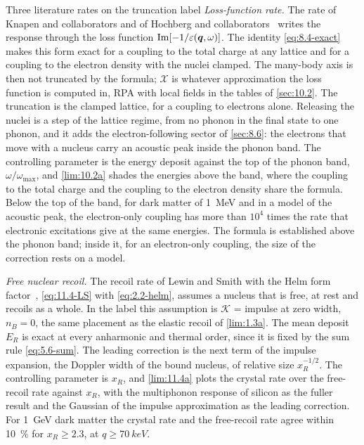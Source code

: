 \begin{workedexample}{Three literature rates on the truncation label}
\emph{Loss-function rate.} The rate of Knapen and collaborators and of Hochberg and collaborators~\cites[Eqs.~(6) and (13)]{knapen2021dark}[Eq.~(1)]{hochberg2021determining} writes the response through the loss function $\operatorname{Im}[-1/\varepsilon(\bm{q},\omega)]$. The identity \cref{eq:8.4-exact} makes this form exact for a coupling to the total charge at any lattice and for a coupling to the electron density with the nuclei clamped. The many-body axis is then not truncated by the formula; $\mathcal{X}$ is whatever approximation the loss function is computed in, RPA with local fields in the tables of \cref{sec:10.2}. The truncation is the clamped lattice, for a coupling to electrons alone. Releasing the nuclei is a step of the lattice regime, from no phonon in the final state to one phonon, and it adds the electron-following sector of \cref{sec:8.6}: the electrons that move with a nucleus carry an acoustic peak inside the phonon band. The controlling parameter is the energy deposit against the top of the phonon band, $\omega/\omega_{\max}$, and \cref{lim:10.2a} shades the energies above the band, where the coupling to the total charge and the coupling to the electron density share the formula. Below the top of the band, for dark matter of \SI{1}{MeV} and in a model of the acoustic peak, the electron-only coupling has more than $10^4$ times the rate that electronic excitations give at the same energies. The formula is established above the phonon band; inside it, for an electron-only coupling, the size of the correction rests on a model.

\emph{Free nuclear recoil.} The recoil rate of Lewin and Smith with the Helm form factor~\cite{lewin1996review}, \cref{eq:11.4-LS} with \cref{eq:2.2-helm}, assumes a nucleus that is free, at rest and recoils as a whole. In the label this assumption is $\mathcal{K}$ = impulse at zero width, $n_B = 0$, the same placement as the elastic recoil of \cref{lim:1.3a}. The mean deposit $E_R$ is exact at every anharmonic and thermal order, since it is fixed by the sum rule \cref{eq:5.6-sum}. The leading correction is the next term of the impulse expansion, the Doppler width of the bound nucleus, of relative size $x_R^{-1/2}$. The controlling parameter is $x_R$, and \cref{lim:11.4a} plots the crystal rate over the free-recoil rate against $x_R$, with the multiphonon response of silicon as the fuller result and the Gaussian of the impulse approximation as the leading correction. For \SI{1}{GeV} dark matter the crystal rate and the free-recoil rate agree within \SI{10}{\percent} for $x_R \ge 2.3$, at $q \ge \SI{70}{keV}$.


\end{workedexample}
